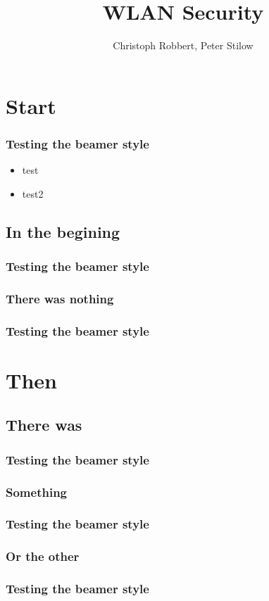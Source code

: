 \documentclass{beamer}
\author[C.Robbert, P. Stilow]{Christoph Robbert, Peter Stilow}
\institute[Uni Paderborn]{Universität Paderborn}
\title[WLAN Security]{WLAN Security}
\begin{document}
\begin{frame}
\maketitle
\end{frame}
\section{Start}
\begin{frame}
\frametitle{Testing the beamer style}
\begin{itemize}
	\item test
	\item test2
\end{itemize}
\end{frame}
\subsection{In the begining}
\begin{frame}
\frametitle{Testing the beamer style}
\end{frame}
\subsubsection{There was nothing}
\begin{frame}
\frametitle{Testing the beamer style}
\end{frame}
\section{Then}
\subsection{There was}
\begin{frame}
\frametitle{Testing the beamer style}
\end{frame}
\subsubsection{Something}
\begin{frame}
\frametitle{Testing the beamer style}
\end{frame}
\subsubsection{Or the other}
\begin{frame}
\frametitle{Testing the beamer style}
\end{frame}
\end{document}
